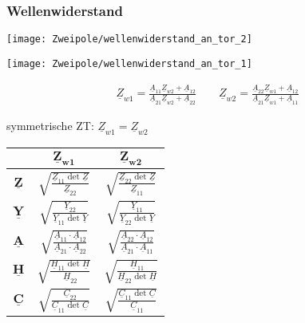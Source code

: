 \subsubsection{Wellenwiderstand}
\begin{minipage}{0.5\columnwidth}
\texttt{[image: Zweipole/wellenwiderstand\_an\_tor\_2]}
\end{minipage}
\begin{minipage}{0.5\columnwidth}
	\texttt{[image: Zweipole/wellenwiderstand\_an\_tor\_1]}
\end{minipage}
\begin{gather*}
	\boxed{
	\underline{Z}_{w1} = \frac{\underline{A}_{11}\underline{Z}_{w2} + \underline{A}_{12}}{\underline{A}_{21}\underline{Z}_{w2}+\underline{A}_{22}}
	} \qquad \boxed{
  	\underline{Z}_{w2} = \frac{\underline{A}_{22}\underline{Z}_{w1} + \underline{A}_{12}}{\underline{A}_{21}\underline{Z}_{w1}+\underline{A}_{11}}
  	}
\end{gather*}
\begin{minipage}{0.5\columnwidth}
\renewcommand{\arraystretch}{2}
	symmetrische ZT: $\underline{Z}_{w1}=\underline{Z}_{w2}$\\
	\begin{tabular}{|c|c|c|}
		\hline
		& $\boldsymbol{\underline{Z}_{w1}}$ & $\boldsymbol{\underline{Z}_{w2}}$
		\\
		\hline
		$\underline{\boldsymbol{Z}}$ & $\sqrt{\frac{\underline{Z}_{11}\operatorname{det}\underline{Z}}{\underline{Z}_{22}}}$ & $\sqrt{\frac{\underline{Z}_{22}\operatorname{det}\underline{Z}}{\underline{Z}_{11}}}$
		\\
		\hline
		$\underline{\boldsymbol{Y}}$ & $\sqrt{\frac{\underline{Y}_{22}}{\underline{Y}_{11}\operatorname{det}\underline{Y}}}$ & $\sqrt{\frac{\underline{Y}_{11}}{\underline{Y}_{22}\operatorname{det}\underline{Y}}}$
		\\
		\hline
		$\underline{\boldsymbol{A}}$ & $\sqrt{\frac{\underline{A}_{11}\cdot\underline{A}_{12}}{\underline{A}_{21}\cdot\underline{A}_{22}}}$ & $\sqrt{\frac{\underline{A}_{22}\cdot\underline{A}_{12}}{\underline{A}_{21}\cdot\underline{A}_{11}}}$
		\\
		\hline
		$\underline{\boldsymbol{H}}$ & $\sqrt{\frac{\underline{H}_{11}\operatorname{det}\underline{H}}{\underline{H}_{22}}}$ & $\sqrt{\frac{\underline{H}_{11}}{\underline{H}_{22}\operatorname{det}\underline{H}}}$
		\\
		\hline
		$\underline{\boldsymbol{C}}$ & $\sqrt{\frac{\underline{C}_{22}}{\underline{C}_{11}\operatorname{det}\underline{C}}}$ & $\sqrt{\frac{\underline{C}_{11}\operatorname{det}\underline{C}}{\underline{C}_{11}}}$
		\\
		\hline
	\end{tabular}
\end{minipage}
